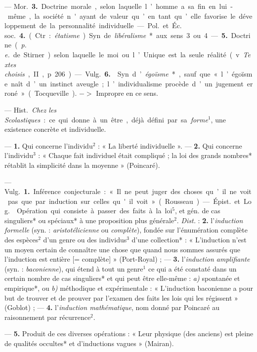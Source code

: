 \begin{itemize}[leftmargin=1cm, label=, itemsep=1pt]
—  \si{Mor.} {\bf 3.} Doctrine morale, selon laquelle l’homme a sa
fin en lui-même, la société n'ayant de valeur qu’en tant qu’elle favorise le
développement de la personnalité individuelle. — \si{Pol.} et \si{Éc. soc.} 
{\bf 4.} (Ctr. : {\it étatisme}). Syn. de {\it libéralisme}* aux sens 3 ou
4. — {\bf 5.} Doctrine ({\it p. e.} de Stirner) selon laquelle
le moi ou l’Unique est la seule réalité (v. {\it Textes choisis}, II, p. 206).

— \si{Vulg.} {\bf 6.}  Syn. d’{\it égoïsme}*, sauf que
« l’égoïsme naît d’un instinct aveugle; l’individualisme procède d’un
jugement erroné » (Tocqueville). $->$ Impropre en ce sens.

 — \si{Hist.} {\it Chez les Scolastiques} :
ce qui donne à un être, déjà défini par sa {\it forme}$^1$, une existence
concrète et individuelle.

 — {\bf 1.} Qui concerne l'individu$^2$ : « La liberté
individuelle ». —  {\bf 2.} Qui concerne l’individu$^3$ : « Chaque fait
individuel était compliqué ; la loi des grands nombres* rétablit la
simplicité dans la moyenne » (Poincaré).

 — \si{Vulg.} {\bf 1.} Inférence conjecturale : « Il ne peut
juger des choses qu’il ne voit pas que par induction sur celles qu'il
voit » (Rousseau).

— \si{Épist.} et \si{Log.}  Opération qui consiste à passer
des faits à la loi$^5$, et gén. de cas singuliers* ou spéciaux* à une
proposition plus générale$^2$. {\it Dist.} : {\bf 2.} l'{\it induction
formelle} (syn. : {\it aristotélicienne} ou {\it complète}), fondée sur
l’énumération complète des espèces$^2$ d’un genre ou des individus$^3$ d’une
collection* : « L'induction n’est un moyen certain de connaître une chose que
quand nous sommes assurés que l'induction est entière [= complète] »
(Port-Royal) ; — {\bf 3.} l’{\it induction amplifiante} (syn. :
{\it baconienne}), qui étend à tout un genre$^1$ ce qui a été constaté dans
un certain nombre de cas singuliers* et qui peut être elle-même : {\it a)}
spontanée et empirique*, ou {\it b)} méthodique et expérimentale : « L’induction
baconienne a pour but de trouver et de
prouver par l’examen des faits les lois qui les régissent » (Goblot) ; —
{\bf 4.} l'{\it induction mathématique}, nom donné par Poincaré au
raisonnement par récurrence$^2$.

— {\bf 5.}  Produit de ces diverses opérations : « Leur
physique (des anciens) est pleine de qualités occultes* et d'inductions
vagues » (Mairan).


\end{itemize}
